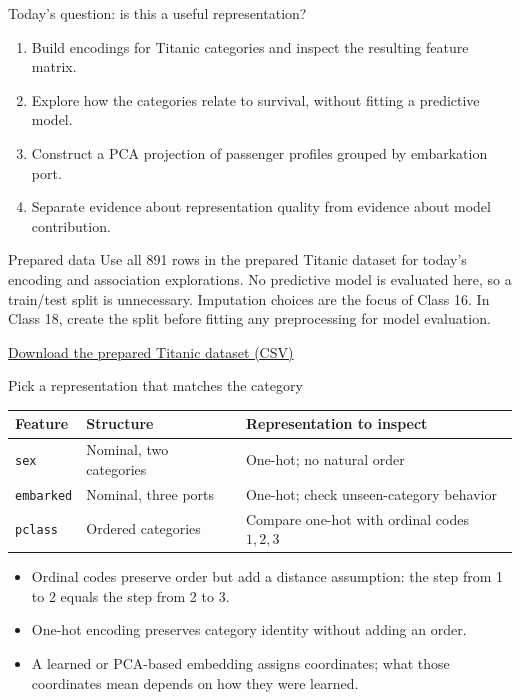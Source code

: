 \begin{frame}{Today's question: is this a useful representation?}
\begin{enumerate}
\item Build encodings for Titanic categories and inspect the resulting feature matrix.
\item Explore how the categories relate to survival, without fitting a predictive model.
\item Construct a PCA projection of passenger profiles grouped by embarkation port.
\item Separate evidence about representation quality from evidence about model contribution.
\end{enumerate}
\begin{block}{Prepared data}
Use all 891 rows in the prepared Titanic dataset for today's encoding and association explorations. No predictive model is evaluated here, so a train/test split is unnecessary. Imputation choices are the focus of Class 16. In Class 18, create the split before fitting any preprocessing for model evaluation.
\end{block}
\vspace{0.2em}
\centering\small\href{../notebooks/Class15_Titanic_Imputed.csv}{Download the prepared Titanic dataset (CSV)}
\coursefooter
\end{frame}

\begin{frame}{Pick a representation that matches the category}
\begin{tabularx}{\textwidth}{>{\ttfamily}l l X}
\toprule
Feature & Structure & Representation to inspect \\
\midrule
\texttt{sex} & Nominal, two categories & One-hot; no natural order \\
\texttt{embarked} & Nominal, three ports & One-hot; check unseen-category behavior \\
\texttt{pclass} & Ordered categories & Compare one-hot with ordinal codes $1,2,3$ \\
\bottomrule
\end{tabularx}
\vspace{0.7em}
\begin{itemize}
\item Ordinal codes preserve order but add a distance assumption: the step from 1 to 2 equals the step from 2 to 3.
\item One-hot encoding preserves category identity without adding an order.
\item A learned or PCA-based embedding assigns coordinates; what those coordinates mean depends on how they were learned.
\end{itemize}
\coursefooter
\end{frame}


